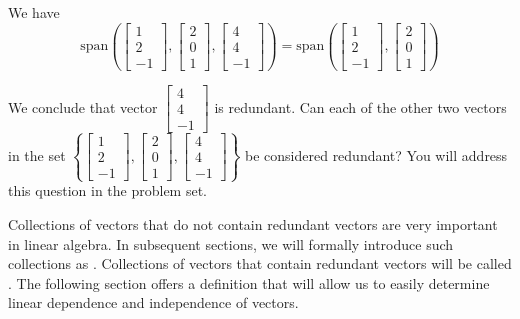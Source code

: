 \documentclass{ximera}
\begin{document}
\begin{exploration}
We have
$$\mbox{span}\left(\begin{bmatrix}1\\2\\-1\end{bmatrix},\begin{bmatrix}2\\0\\1\end{bmatrix},\begin{bmatrix}4\\4\\-1\end{bmatrix}\right)=\mbox{span}\left(\begin{bmatrix}1\\2\\-1\end{bmatrix},\begin{bmatrix}2\\0\\1\end{bmatrix}\right)$$

 We conclude that vector $\begin{bmatrix}4\\4\\-1\end{bmatrix}$ is redundant.  Can each of the other two vectors in the set 
 $\left\{\begin{bmatrix}1\\2\\-1\end{bmatrix},\begin{bmatrix}2\\0\\1\end{bmatrix},\begin{bmatrix}4\\4\\-1\end{bmatrix}\right\}$ be considered redundant?  You will address this question in the problem set. %
\end{exploration}
 
 Collections of vectors that do not contain redundant vectors are very important in linear algebra.  In subsequent sections, we will formally introduce such collections as .  Collections of vectors that contain redundant vectors will be called .  The following section offers a definition that will allow us to easily determine linear dependence and independence of vectors.
\end{document}
